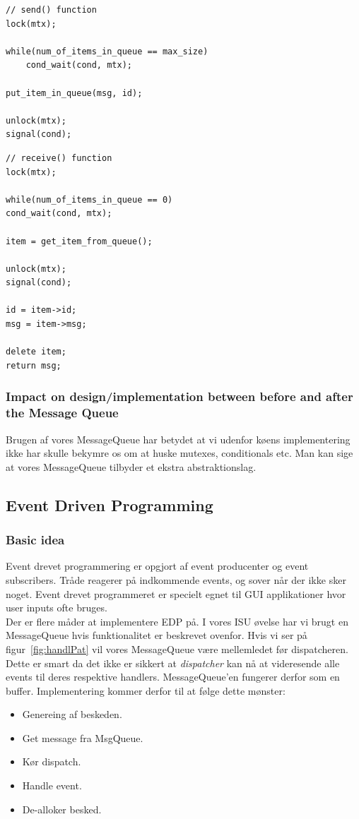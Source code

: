 \begin{lstlisting}[otherkeywords={unlock, lock, signal, cond_wait}]
// send() function
lock(mtx);

while(num_of_items_in_queue == max_size)
	cond_wait(cond, mtx);
	
put_item_in_queue(msg, id);

unlock(mtx);
signal(cond);
\end{lstlisting}

\begin{lstlisting}
// receive() function
lock(mtx);

while(num_of_items_in_queue == 0)
cond_wait(cond, mtx);

item = get_item_from_queue();

unlock(mtx);
signal(cond);

id = item->id;
msg = item->msg;

delete item;
return msg;
\end{lstlisting}

\subsubsection{Impact on design/implementation between before and after the Message Queue}

Brugen af vores MessageQueue har betydet at vi udenfor køens implementering ikke har skulle bekymre os om at huske mutexes, conditionals etc. Man kan sige at vores MessageQueue tilbyder et ekstra abstraktionslag.

\subsection{Event Driven Programming}

\subsubsection{Basic idea}
Event drevet programmering er opgjort af event producenter og event subscribers.
Tråde reagerer på indkommende events, og sover når der ikke sker noget.
Event drevet programmeret er specielt egnet til GUI applikationer hvor user inputs ofte bruges. \\

Der er flere måder at implementere EDP på. I vores ISU øvelse har vi brugt en MessageQueue hvis funktionalitet er beskrevet ovenfor.
Hvis vi ser på figur~\ref{fig:handlPat} vil vores MessageQueue være mellemledet før dispatcheren. Dette er smart da det ikke er sikkert at \textit{dispatcher} kan nå at videresende alle events til deres respektive handlers. MessageQueue'en fungerer derfor som en buffer.
Implementering kommer derfor til at følge dette mønster:
\begin{itemize}
	\item Genereing af beskeden.
	\item Get message fra MsgQueue.
	\item Kør dispatch.
	\item Handle event.
	\item De-alloker besked.
\end{itemize}

